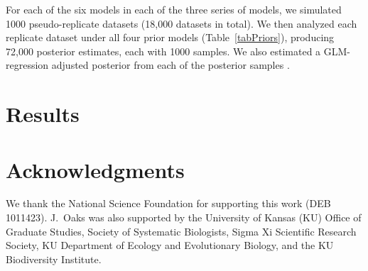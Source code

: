 \documentclass[letterpaper,12pt]{article}
\begin{document}
\begin{linenumbers}
For each of the six models in each of the three series of models, we simulated
1000 pseudo-replicate datasets (18,000 datasets in total).
We then analyzed each replicate dataset under all four prior models
(Table~\ref{tabPriors}), producing 72,000 posterior estimates, each with 1000
samples.
We also estimated a GLM-regression adjusted posterior from each of the
posterior samples \citep{Leuenberger2010}.

\section*{Results}


\section*{Acknowledgments}
We thank the National Science Foundation for supporting this work (DEB
1011423).
J.\ Oaks was also supported by the University of Kansas (KU) Office of Graduate
Studies, Society of Systematic Biologists, Sigma Xi Scientific Research
Society, KU Department of Ecology and Evolutionary Biology, and the KU
Biodiversity Institute.



\newpage
\singlespacing

\renewcommand\listfigurename{Figure Captions}
\renewcommand\cftdotsep{\cftnodots}
\setlength\cftbeforefigskip{10pt}
\listoffigures


\end{linenumbers}

\newpage
\singlespacing
\end{document}
